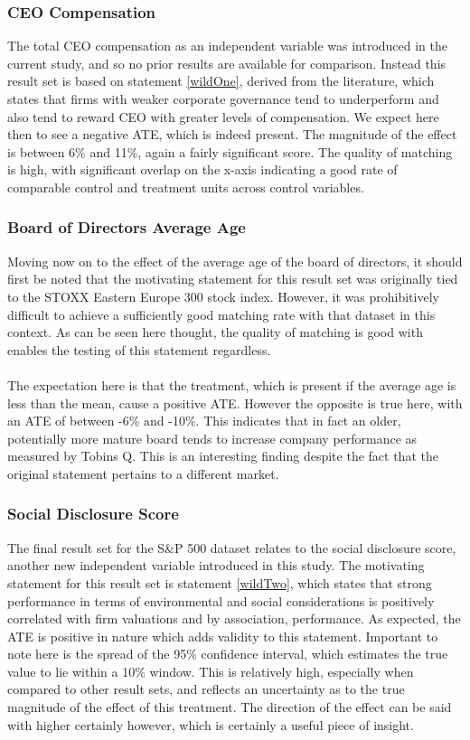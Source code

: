 \subsubsection{CEO Compensation}
{The total CEO compensation as an independent variable was introduced in the current study, and so no prior results are available for comparison. Instead this result set is based on statement \ref{wildOne}, derived from the literature, which states that firms with weaker corporate governance tend to underperform and also tend to reward CEO with greater levels of compensation. We expect here then to see a negative ATE, which is indeed present. The magnitude of the effect is between 6\% and 11\%, again a fairly significant score. The quality of matching is high, with significant overlap on the x-axis indicating a good rate of comparable control and treatment units across control variables. }
\subsubsection{Board of Directors Average Age}
{Moving now on to the effect of the average age of the board of directors, it should first be noted that the motivating statement for this result set was originally tied to the STOXX Eastern Europe 300 stock index. However, it was prohibitively difficult to achieve a sufficiently good matching rate with that dataset in this context. As can be seen here thought, the quality of matching is good with enables the testing of this statement regardless.\\\\ The expectation here is that the treatment, which is present if the average age is less than the mean, cause a positive ATE. However the opposite is true here, with an ATE of between -6\% and -10\%. This indicates that in fact an older, potentially more mature board tends to increase company performance as measured by Tobins Q. This is an interesting finding despite the fact that the original statement pertains to a different market.}
\subsubsection{Social Disclosure Score}
{The final result set for the S\&P 500 dataset relates to the social disclosure score, another new independent variable introduced in this study. The motivating statement for this result set is statement \ref{wildTwo}, which states that strong performance in terms of environmental and social considerations is positively correlated with firm valuations and by association, performance. As expected, the ATE is positive in nature which adds validity to this statement. Important to note here is the spread of the 95\% confidence interval, which estimates the true value to lie within a 10\% window. This is relatively high, especially when compared to other result sets, and reflects an uncertainty as to the true magnitude of the effect of this treatment. The direction of the effect can be said with higher certainly however, which is certainly a useful piece of insight. }
